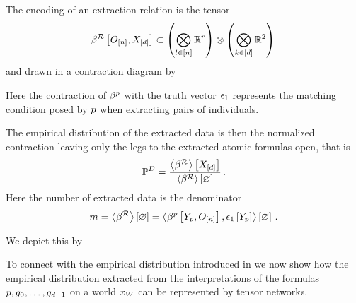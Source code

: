 The encoding of an extraction relation is the tensor
\begin{align*}
    \beta^{\mathcal{R}}\left[O_{[n]},X_{[d]}\right] \subset \left(\bigotimes_{l\in[n]}\mathbb{R}^{r}\right) \otimes \left(\bigotimes_{k\in[d]}\mathbb{R}^2\right) \,
\end{align*}
and drawn in a contraction diagram by
\begin{center}
    
\end{center}
Here the contraction of $\beta^{p}$ with the truth vector $\epsilon_1$ represents the matching condition posed by $p$ when extracting pairs of individuals.

The empirical distribution of the extracted data is then the normalized contraction leaving only the legs to the extracted atomic formulas open, that is
\begin{align*}
    \mathbb{P}^{D}
    = \frac{
        \left\langle \beta^{\mathcal{R}}\right\rangle \left[ X_{[d]} \right]
    }{
        \left\langle \beta^{\mathcal{R}}\right\rangle \left[ \varnothing \right]
    }  \, .
\end{align*}
Here the number of extracted data is the denominator
\begin{align*}
    m
    = \left\langle \beta^{\mathcal{R}}\right\rangle \left[ \varnothing \right]
    = \left\langle \beta^{p}\left[Y_{p},O_{[n]}\right],\epsilon_1\left[Y_{p}\right]\right\rangle \left[ \varnothing \right]\, .
\end{align*}

We depict this by
\begin{center}
    
\end{center}


To connect with the empirical distribution introduced in  we now show how the empirical distribution extracted from the interpretations of the formulas $p,g_{0},\ldots,g_{d-1}$ on a \firstOrderLogic{} world $x_{W}$ can be represented by tensor networks.

